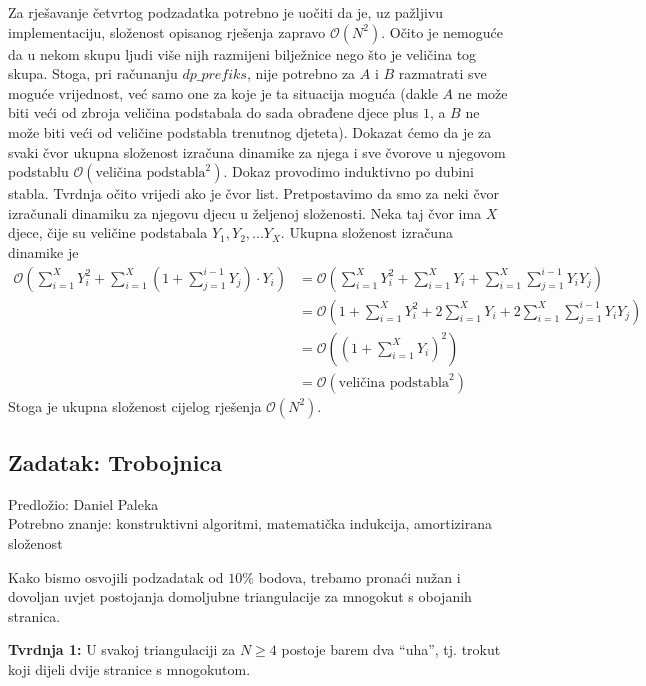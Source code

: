 \documentclass[a4paper]{article}
\begin{document}
Za rješavanje četvrtog podzadatka potrebno je uočiti da je, uz pažljivu implementaciju,
složenost opisanog rješenja zapravo $\mathcal{O}(N^2)$. Očito je nemoguće da u nekom skupu
ljudi više nijh razmijeni bilježnice nego što je veličina tog skupa. Stoga, pri računanju
$dp\_prefiks$, nije potrebno za $A$ i $B$ razmatrati sve moguće vrijednost, već samo one za
koje je ta situacija moguća (dakle $A$ ne može biti veći od zbroja veličina podstabala do sada
obrađene djece plus $1$, a $B$ ne može biti veći od veličine podstabla trenutnog djeteta).
Dokazat ćemo da je za svaki čvor ukupna složenost izračuna dinamike za njega i sve čvorove u
njegovom podstablu $\mathcal{O}(\text{veličina podstabla}^2)$. Dokaz provodimo induktivno po
dubini stabla. Tvrdnja očito vrijedi ako je čvor list. Pretpostavimo da smo za neki čvor
izračunali dinamiku za njegovu djecu u željenoj složenosti. Neka taj čvor ima $X$ djece,
čije su veličine podstabala $Y_1, Y_2, ... Y_X$. Ukupna složenost izračuna dinamike je
\begin{align*}
    \mathcal{O} \left( \sum_{i=1}^{X} Y_i^2 +
    \sum_{i=1}^{X}(1 + \sum_{j=1}^{i-1}Y_j) \cdot Y_i \right)
    &= \mathcal{O} \left( \sum_{i=1}^{X}Y_i^2 + \sum_{i=1}^{X}Y_i +
    \sum_{i=1}^{X}\sum_{j=1}^{i-1}Y_i Y_j \right) \\
    &= \mathcal{O} \left( 1 + \sum_{i=1}^{X}Y_i^2 + 2\sum_{i=1}^{X}Y_i +
    2\sum_{i=1}^{X}\sum_{j=1}^{i-1}Y_i Y_j \right) \\
    &= \mathcal{O} \left( (1 + \sum_{i=1}^X Y_i)^2 \right) \\
    &= \mathcal{O} (\text{veličina podstabla}^2) 
\end{align*}
Stoga je ukupna složenost cijelog rješenja $\mathcal{O}(N^2)$.

\clearpage

\subsection*{Zadatak: Trobojnica}
\textsf{Predložio: Daniel Paleka}\\
\textsf{Potrebno znanje: konstruktivni algoritmi, matematička indukcija, amortizirana složenost}

Kako bismo osvojili podzadatak od $10\%$ bodova, trebamo pronaći nužan i dovoljan uvjet postojanja
domoljubne triangulacije za mnogokut s obojanih stranica.

\textbf{Tvrdnja 1: } \; U svakoj triangulaciji za $N \ge 4$ postoje barem dva ``uha'', tj. trokut
koji dijeli dvije stranice s mnogokutom.
\end{document}

